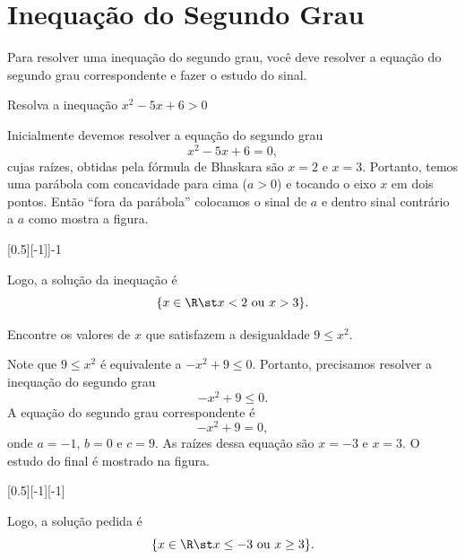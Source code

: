 \section{Inequação do Segundo Grau}

Para resolver uma inequação do segundo grau, você deve resolver a equação do
segundo grau correspondente e fazer o estudo do sinal.

\begin{example}
  Resolva a inequação $x^2-5x+6>0$

  \solution
  Inicialmente devemos resolver a equação do segundo grau
  \[
    x^2 - 5x + 6 = 0,
  \]
  cujas raízes, obtidas pela fórmula de Bhaskara são $x=2$ e $x=3$.
  Portanto, temos uma parábola com concavidade para cima ($a>0$)
  e tocando o eixo $x$ em dois pontos.
  Então ``fora da parábola'' colocamos o sinal de $a$ e dentro sinal
  contrário a $a$ como mostra a figura.

  [0.5][-1]]-1

  Logo, a solução da inequação é
  \[
    \{ x \in \R \st x < 2 \text{ ou } x > 3 \}.
  \]
\end{example}

\begin{example}
  Encontre os valores de $x$ que satisfazem a desigualdade $9 \leq x^2$.

  \solution
  Note que $9 \leq x^2 $ é equivalente a $-x^2+9 \leq 0$.
  Portanto, precisamos resolver a inequação do segundo grau
  \[
    -x^2 + 9 \leq 0.
  \]
  A equação do segundo grau correspondente é
  \[
    -x^2 + 9 = 0,
  \]
  onde $a=-1$, $b=0$ e $c=9$. As raízes dessa equação são $x=-3$ e $x=3$.
  O estudo do final é mostrado na figura.

  [0.5][-1][-1]

  Logo, a solução pedida é
  \[
    \{ x \in \R \st x \leq -3 \text{ ou } x \geq 3 \}.
  \]
\end{example}
